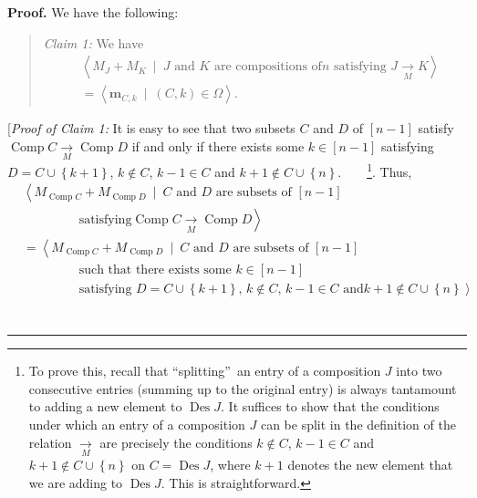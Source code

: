 \documentclass[numbers=enddot,12pt,final,onecolumn,notitlepage]{scrartcl}%
\theoremstyle{definition}
\newenvironment{statement}{\begin{quote}}{\end{quote}}
\newenvironment{proof}[1][Proof]{\noindent\textbf{#1.} }{\ \rule{0.5em}{0.5em}}
\newenvironment{verlong}{}{}
\begin{document}
\begin{verlong}
\begin{proof}
We have the following:

\begin{statement}
\textit{Claim 1:} We have%
\begin{align*}
&  \left\langle M_{J}+M_{K}\ \mid\ J\text{ and }K\text{ are compositions of
}n\text{ satisfying }J\underset{M}{\rightarrow}K\right\rangle \\
&  =\left\langle \mathbf{m}_{C,k}\ \mid\ \left(  C,k\right)  \in
\Omega\right\rangle .
\end{align*}

\end{statement}

[\textit{Proof of Claim 1:} It is easy to see that two subsets $C$ and $D$ of
$\left[  n-1\right]  $ satisfy $\operatorname*{Comp}C\underset{M}{\rightarrow
}\operatorname*{Comp}D$ if and only if there exists some $k\in\left[
n-1\right]  $ satisfying $D=C\cup\left\{  k+1\right\}  $, $k\notin C$, $k-1\in
C$ and $k+1\notin C\cup\left\{  n\right\}  $.\ \ \ \ \footnote{To prove this,
recall that \textquotedblleft splitting\textquotedblright\ an entry of a
composition $J$ into two consecutive entries (summing up to the original
entry) is always tantamount to adding a new element to $\operatorname{Des}J$.
It suffices to show that the conditions under which an entry of a composition
$J$ can be split in the definition of the relation $\underset{M}{\rightarrow}$
are precisely the conditions $k\notin C$, $k-1\in C$ and $k+1\notin
C\cup\left\{  n\right\}  $ on $C=\operatorname{Des}J$, where $k+1$ denotes
the new element that we are adding to $\operatorname{Des}J$. This is
straightforward.}. Thus,%
\begin{align*}
&  \left\langle M_{\operatorname*{Comp}C}+M_{\operatorname*{Comp}D}%
\ \mid\ C\text{ and }D\text{ are subsets of }\left[  n-1\right]  \right. \\
&  \ \ \ \ \ \ \ \ \ \ \ \ \ \ \ \ \ \ \ \ \left.  \text{satisfying
}\operatorname*{Comp}C\underset{M}{\rightarrow}\operatorname*{Comp}%
D\right\rangle \\
&  =\left\langle M_{\operatorname*{Comp}C}+M_{\operatorname*{Comp}D}%
\ \mid\ C\text{ and }D\text{ are subsets of }\left[  n-1\right]  \right. \\
&  \ \ \ \ \ \ \ \ \ \ \ \ \ \ \ \ \ \ \ \ \left.  \text{such that there
exists some }k\in\left[  n-1\right]  \right. \\
&  \ \ \ \ \ \ \ \ \ \ \ \ \ \ \ \ \ \ \ \ \left.  \text{satisfying }%
D=C\cup\left\{  k+1\right\}  \text{, }k\notin C\text{, }k-1\in C\text{ and
}k+1\notin C\cup\left\{  n\right\}  \right\rangle \\

\end{align*}
\end{proof}
\end{verlong}
\end{document}
